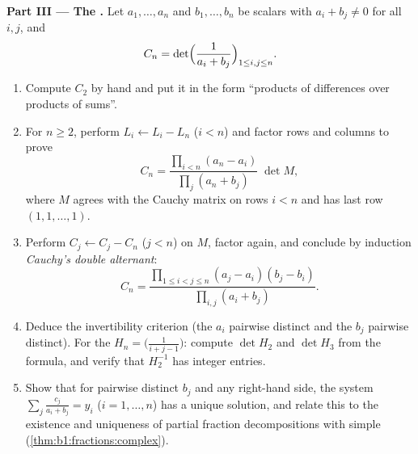\begin{problem}
\medskip
\noindent\textbf{Part III --- The .} Let $a_1,
\dots, a_n$ and $b_1, \dots, b_n$ be scalars with $a_i + b_j
\neq 0$ for all $i, j$, and
\[
C_n = \det\Bigl(\frac{1}{a_i + b_j}\Bigr)_{1 \leq i, j \leq n} .
\]
\begin{enumerate}[resume]
  \item Compute $C_2$ by hand and put it in the form
        ``products of differences over products of sums''.
  \item For $n \geq 2$, perform $L_i \leftarrow L_i - L_n$ ($i <
        n$) and factor rows and columns to prove
        \[
        C_n = \frac{\prod_{i<n}(a_n - a_i)}{\prod_{j}(a_n +
        b_j)}\;\det M,
        \]
        where $M$ agrees with the Cauchy matrix on rows $i < n$
        and has last row $(1, 1, \dots, 1)$.
  \item Perform $C_j \leftarrow C_j - C_n$ ($j < n$) on $M$,
        factor again, and conclude by induction
        \emph{Cauchy's double alternant}:
        \[
        C_n = \frac{\prod_{1 \leq i < j \leq n}(a_j - a_i)(b_j -
        b_i)}{\prod_{i, j}(a_i + b_j)} .
        \]
  \item Deduce the invertibility criterion (the $a_i$ pairwise
        distinct and the $b_j$ pairwise distinct). For the
        \emph{} $H_n = \bigl(\frac{1}{i + j -
        1}\bigr)$: compute $\det H_2$ and $\det H_3$ from the
        formula, and verify that $H_2^{-1}$ has integer entries.
  \item Show that for pairwise distinct $b_j$ and any right-hand
        side, the system $\sum_j \frac{c_j}{a_i + b_j} = y_i$
        ($i = 1, \dots, n$) has a unique solution, and relate
        this to the existence and uniqueness of partial fraction
        decompositions with simple 
        (\cref{thm:b1:fractions:complex}).
\end{enumerate}


\end{problem}
